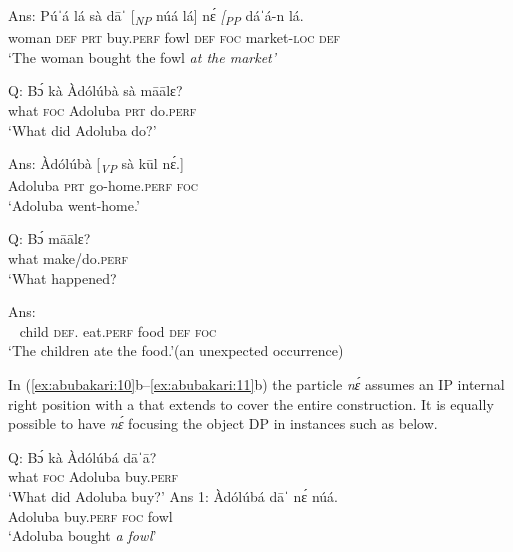 \documentclass[output=paper,modfonts,nonflat,
 hidelinks
]{langsci/langscibook}
\begin{document}
\ex\label{ex:abubakari:9b}
Ans: \gll Púˈá  lá  sà  dāˈ  [\textit{\textsubscript{NP} } núá  lá]  nɛ́  \textit{[\textsubscript{PP} } dáˈá-n          lá.\\
woman  \textsc{def}   \textsc{prt}  buy.\textsc{perf} {} fowl  \textsc{def}  \textsc{foc} {} market-\textsc{loc}   \textsc{def}\\
 \glt    ‘The woman bought the fowl \textit{at the market’}

\z
\z 
 
\ea\label{ex:abubakari:10}
\ea\label{ex:abubakari:10a} 
Q: \gll Bɔ́  kà  Àdólúbà  sà  māālɛ?         \\
what  \textsc{foc}  Adoluba  \textsc{prt}  do.\textsc{perf}\\              
\glt ‘What did Adoluba do?’        

\ex\label{ex:abubakari:10b}
Ans: \gll Àdólúbà  [\textit{\textsubscript{VP}	} sà  kūl      nɛ́.]\\
Adoluba {}   \textsc{prt}  go-home.\textsc{perf}   \textsc{foc}\\
\glt ‘Adoluba went-home.’
\z
\z
 
\ea\label{ex:abubakari:11}
\ea\label{ex:abubakari:11a}
Q: \gll Bɔ́  māālɛ? \\
what  make/do.\textsc{perf}\\                                            
\glt ‘What happened?   

\ex\label{ex:abubakari:11b}
Ans: \\
~ child   \textsc{def}.  eat.\textsc{perf}  food  \textsc{def}  \textsc{foc}\\
\glt ‘The children ate the food.’(an unexpected occurrence)   
\z
\z

\newpage 
In (\ref{ex:abubakari:10}b--\ref{ex:abubakari:11}b) the particle \textit{nɛ́} assumes an IP internal right position with a  that extends to cover the entire construction. It is equally possible to have \textit{nɛ́} focusing the object DP in instances such as below.

 
\ea\label{ex:abubakari:12}
\ea\label{ex:abubakari:12a} 
Q: \gll Bɔ́  kà  Àdólúbá  dāˈā?\\
what  \textsc{foc}  Adoluba  buy.\textsc{perf}\\
\glt ‘What did Adoluba buy?’
\ex\label{ex:abubakari:12b} 
Ans 1: \gll Àdólúbá  dāˈ    nɛ́  núá.     \\
Adoluba   buy.\textsc{perf}  \textsc{foc}  fowl\\
\glt ‘Adoluba bought \textit{a fowl}’
 
\end{document}
